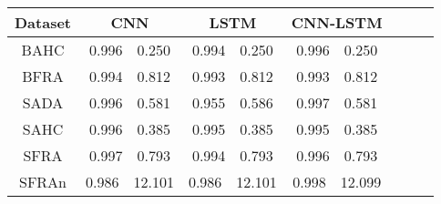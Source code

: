 \begin{tabular}{c|cccccc} \toprule
%
Dataset &     CNN       &    LSTM       &   CNN-LSTM    \\\midrule
BAHC    & 0.996~~0.250  & 0.994~~0.250  & 0.996~~0.250  \\
BFRA    & 0.994~~0.812  & 0.993~~0.812  & 0.993~~0.812  \\
SADA    & 0.996~~0.581  & 0.955~~0.586  & 0.997~~0.581  \\
SAHC    & 0.996~~0.385  & 0.995~~0.385  & 0.995~~0.385  \\
SFRA    & 0.997~~0.793  & 0.994~~0.793  & 0.996~~0.793  \\
SFRAn   & 0.986~~12.101 & 0.986~~12.101 & 0.998~~12.099 \\\bottomrule
\end{tabular}
